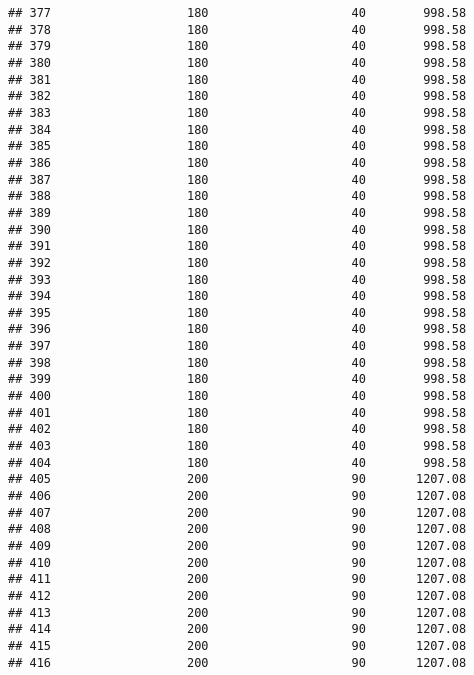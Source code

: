 \documentclass[]{article}
\begin{document}
\begin{verbatim}
## 377                   180                    40        998.58
## 378                   180                    40        998.58
## 379                   180                    40        998.58
## 380                   180                    40        998.58
## 381                   180                    40        998.58
## 382                   180                    40        998.58
## 383                   180                    40        998.58
## 384                   180                    40        998.58
## 385                   180                    40        998.58
## 386                   180                    40        998.58
## 387                   180                    40        998.58
## 388                   180                    40        998.58
## 389                   180                    40        998.58
## 390                   180                    40        998.58
## 391                   180                    40        998.58
## 392                   180                    40        998.58
## 393                   180                    40        998.58
## 394                   180                    40        998.58
## 395                   180                    40        998.58
## 396                   180                    40        998.58
## 397                   180                    40        998.58
## 398                   180                    40        998.58
## 399                   180                    40        998.58
## 400                   180                    40        998.58
## 401                   180                    40        998.58
## 402                   180                    40        998.58
## 403                   180                    40        998.58
## 404                   180                    40        998.58
## 405                   200                    90       1207.08
## 406                   200                    90       1207.08
## 407                   200                    90       1207.08
## 408                   200                    90       1207.08
## 409                   200                    90       1207.08
## 410                   200                    90       1207.08
## 411                   200                    90       1207.08
## 412                   200                    90       1207.08
## 413                   200                    90       1207.08
## 414                   200                    90       1207.08
## 415                   200                    90       1207.08
## 416                   200                    90       1207.08

\end{verbatim}
\end{document}
